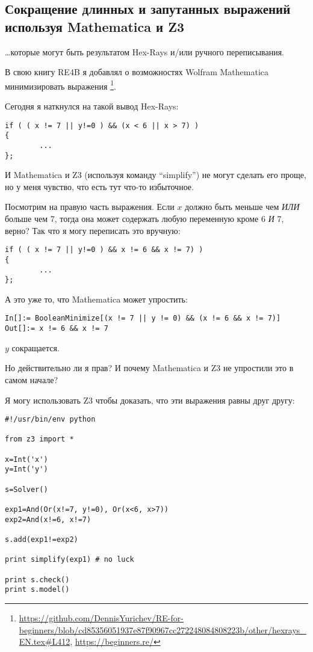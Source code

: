 \subsection{Сокращение длинных и запутанных выражений используя Mathematica и Z3}

\dots которые могут быть результатом Hex-Rays и/или ручного переписывания.

В свою книгу RE4B я добавлял о возможностях Wolfram Mathematica минимизировать выражения
\footnote{\url{https://github.com/DennisYurichev/RE-for-beginners/blob/cd85356051937e87f90967cc272248084808223b/other/hexrays_EN.tex\#L412}, \url{https://beginners.re/}}.

Сегодня я наткнулся на такой вывод Hex-Rays:

\begin{lstlisting}
if ( ( x != 7 || y!=0 ) && (x < 6 || x > 7) )
{
        ...
};
\end{lstlisting}

И Mathematica и Z3 (используя команду ``simplify'') не могут сделать его проще, но у меня чувство, что есть тут что-то
избыточное.

Посмотрим на правую часть выражения.
Если $x$ должно быть меньше чем \textit{ИЛИ} больше чем 7, тогда она может содержать любую переменную кроме 6 \textit{И} 7, верно?
Так что я могу переписать это вручную:

\begin{lstlisting}
if ( ( x != 7 || y!=0 ) && x != 6 && x != 7) )
{
        ...
};
\end{lstlisting}

А это уже то, что Mathematica может упростить:

\begin{lstlisting}
In[]:= BooleanMinimize[(x != 7 || y != 0) && (x != 6 && x != 7)]
Out[]:= x != 6 && x != 7
\end{lstlisting}

$y$ сокращается.

Но действительно ли я прав?
И почему Mathematica и Z3 не упростили это в самом начале?

Я могу использовать Z3 чтобы доказать, что эти выражения равны друг другу:

\begin{lstlisting}
#!/usr/bin/env python

from z3 import *

x=Int('x')
y=Int('y')

s=Solver()

exp1=And(Or(x!=7, y!=0), Or(x<6, x>7))
exp2=And(x!=6, x!=7)

s.add(exp1!=exp2)

print simplify(exp1) # no luck

print s.check()
print s.model()
\end{lstlisting}

